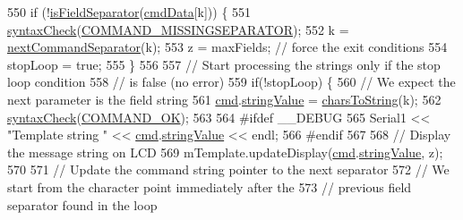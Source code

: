 \begin{DoxyCode}
550               \textcolor{keywordflow}{if} (!\hyperlink{_meditech___chip_kit_control_panel_8pde_a5e204e0bba8ab8ee2bde88215bf2ee53}{isFieldSeparator}(\hyperlink{_meditech___chip_kit_control_panel_8pde_afd31a444e0380e6be247c64cdb1510a9}{cmdData}[k])) \{
551                 \hyperlink{_meditech___chip_kit_control_panel_8pde_a586164a6eff90eab6ba87a6ca123770d}{syntaxCheck}(\hyperlink{_parser_errors_8h_af1641bf12003024ece5012a639004d5c}{COMMAND\_MISSINGSEPARATOR});
552                 k = \hyperlink{_meditech___chip_kit_control_panel_8pde_a4b62bbf3dd6cf7eb7fee557932fd1b7c}{nextCommandSeparator}(k);
553                 z = maxFields; \textcolor{comment}{// force the exit conditions}
554                 stopLoop = \textcolor{keyword}{true};
555               \}
556               
557               \textcolor{comment}{// Start processing the strings only if the stop loop condition}
558               \textcolor{comment}{// is false (no error)}
559               \textcolor{keywordflow}{if}(!stopLoop) \{
560                 \textcolor{comment}{// We expect the next parameter is the field string}
561                 \hyperlink{_meditech___chip_kit_control_panel_8pde_a9ec7ba7a86dba057afdae246ca1ac40e}{cmd}.\hyperlink{structparse_command_ac5ece0b161e3fae794d08911247c0b1e}{stringValue} = \hyperlink{_meditech___chip_kit_control_panel_8pde_af256eb98be4447dd754239d6c5cf4792}{charsToString}(k);
562                 \hyperlink{_meditech___chip_kit_control_panel_8pde_a586164a6eff90eab6ba87a6ca123770d}{syntaxCheck}(\hyperlink{_parser_errors_8h_a2c83bbbe0909f24f241850845b38aa9f}{COMMAND\_OK});
563                 
564 \textcolor{preprocessor}{                #ifdef \_\_DEBUG}
565 \textcolor{preprocessor}{}                Serial1 << \textcolor{stringliteral}{"Template string "} << \hyperlink{_meditech___chip_kit_control_panel_8pde_a9ec7ba7a86dba057afdae246ca1ac40e}{cmd}.\hyperlink{structparse_command_ac5ece0b161e3fae794d08911247c0b1e}{stringValue} << endl;
566 \textcolor{preprocessor}{                #endif}
567 \textcolor{preprocessor}{}  
568                 \textcolor{comment}{// Display the message string on LCD}
569                 mTemplate.updateDisplay(\hyperlink{_meditech___chip_kit_control_panel_8pde_a9ec7ba7a86dba057afdae246ca1ac40e}{cmd}.\hyperlink{structparse_command_ac5ece0b161e3fae794d08911247c0b1e}{stringValue}, z);
570                 
571                 \textcolor{comment}{// Update the command string pointer to the next separator}
572                 \textcolor{comment}{// We start from the character point immediately after the }
573                 \textcolor{comment}{// previous field separator found in the loop}

\end{DoxyCode}
